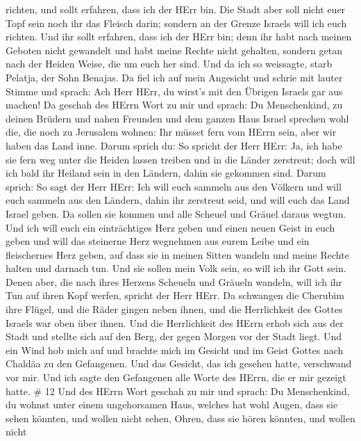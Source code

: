 richten, und sollt erfahren, dass ich der HErr bin.  Die
Stadt aber soll nicht euer Topf sein noch ihr das Fleisch darin; sondern
an der Grenze Israels will ich euch richten.  Und ihr sollt
erfahren, dass ich der HErr bin; denn ihr habt nach meinen Geboten nicht
gewandelt und habt meine Rechte nicht gehalten, sondern getan nach der
Heiden Weise, die um euch her sind.  Und da ich so
weissagte, starb Pelatja, der Sohn Benajas. Da fiel ich auf mein
Angesicht und schrie mit lauter Stimme und sprach: Ach Herr HErr, du
wirst's mit den Übrigen Israels gar aus machen!  Da geschah
des HErrn Wort zu mir und sprach:  Du Menschenkind, zu
deinen Brüdern und nahen Freunden und dem ganzen Haus Israel sprechen
wohl die, die noch zu Jerusalem wohnen: Ihr müsset fern vom HErrn sein,
aber wir haben das Land inne.  Darum sprich du: So spricht
der Herr HErr: Ja, ich habe sie fern weg unter die Heiden lassen treiben
und in die Länder zerstreut; doch will ich bald ihr Heiland sein in den
Ländern, dahin sie gekommen sind.  Darum sprich: So sagt
der Herr HErr: Ich will euch sammeln aus den Völkern und will euch
sammeln aus den Ländern, dahin ihr zerstreut seid, und will euch das
Land Israel geben.  Da sollen sie kommen und alle Scheuel
und Gräuel daraus wegtun.  Und ich will euch ein
einträchtiges Herz geben und einen neuen Geist in euch geben und will
das steinerne Herz wegnehmen aus eurem Leibe und ein fleischernes Herz
geben,  auf dass sie in meinen Sitten wandeln und meine
Rechte halten und darnach tun. Und sie sollen mein Volk sein, so will
ich ihr Gott sein.  Denen aber, die nach ihres Herzens
Scheueln und Gräueln wandeln, will ich ihr Tun auf ihren Kopf werfen,
spricht der Herr HErr.  Da schwangen die Cherubim ihre
Flügel, und die Räder gingen neben ihnen, und die Herrlichkeit des
Gottes Israels war oben über ihnen.  Und die Herrlichkeit
des HErrn erhob sich aus der Stadt und stellte sich auf den Berg, der
gegen Morgen vor der Stadt liegt.  Und ein Wind hob mich
auf und brachte mich im Gesicht und im Geist Gottes nach Chaldäa zu den
Gefangenen. Und das Gesicht, das ich gesehen hatte, verschwand vor mir.
 Und ich sagte den Gefangenen alle Worte des HErrn, die er
mir gezeigt hatte. \# 12  Und des HErrn Wort geschah zu mir
und sprach:  Du Menschenkind, du wohnst unter einem
ungehorsamen Haus, welches hat wohl Augen, dass sie sehen könnten, und
wollen nicht sehen, Ohren, dass sie hören könnten, und wollen nicht
